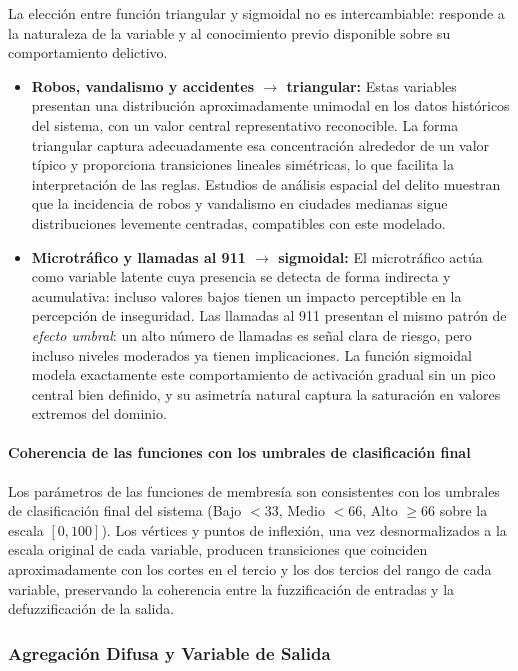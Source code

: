 \documentclass[11pt]{article}
\begin{document}
La elección entre función triangular y sigmoidal no es intercambiable: responde a la naturaleza de la variable y al conocimiento previo disponible sobre su comportamiento delictivo.

\begin{itemize}
    \item \textbf{Robos, vandalismo y accidentes $\rightarrow$ triangular:} Estas variables presentan una distribución aproximadamente unimodal en los datos históricos del sistema, con un valor central representativo reconocible. La forma triangular captura adecuadamente esa concentración alrededor de un valor típico y proporciona transiciones lineales simétricas, lo que facilita la interpretación de las reglas. Estudios de análisis espacial del delito \cite{b6} muestran que la incidencia de robos y vandalismo en ciudades medianas sigue distribuciones levemente centradas, compatibles con este modelado.

    \item \textbf{Microtráfico y llamadas al 911 $\rightarrow$ sigmoidal:} El microtráfico actúa como variable latente cuya presencia se detecta de forma indirecta y acumulativa: incluso valores bajos tienen un impacto perceptible en la percepción de inseguridad. Las llamadas al 911 presentan el mismo patrón de \textit{efecto umbral}: un alto número de llamadas es señal clara de riesgo, pero incluso niveles moderados ya tienen implicaciones. La función sigmoidal modela exactamente este comportamiento de activación gradual sin un pico central bien definido, y su asimetría natural captura la saturación en valores extremos del dominio.
\end{itemize}

\paragraph{Coherencia de las funciones con los umbrales de clasificación final}

Los parámetros de las funciones de membresía son consistentes con los umbrales de clasificación final del sistema (Bajo $< 33$, Medio $< 66$, Alto $\geq 66$ sobre la escala $[0,100]$). Los vértices y puntos de inflexión, una vez desnormalizados a la escala original de cada variable, producen transiciones que coinciden aproximadamente con los cortes en el tercio y los dos tercios del rango de cada variable, preservando la coherencia entre la fuzzificación de entradas y la defuzzificación de la salida.

\subsubsection{Agregación Difusa y Variable de Salida}
\end{document}
